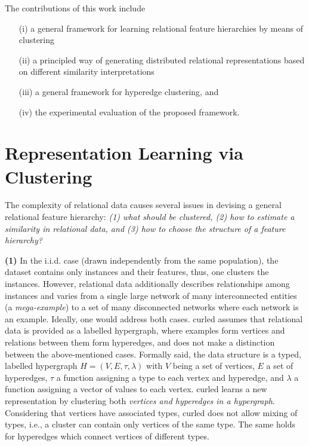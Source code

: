 The contributions of this work include
\begin{itemize}
	\item[(i)] a general framework for learning relational feature hierarchies by means of clustering
	\item[(ii)] a principled way of generating distributed relational representations based on different similarity interpretations
	\item[(iii)] a general framework for hyperedge clustering, and 
	\item[(iv)] the experimental evaluation of the proposed framework.
\end{itemize}



\section{Representation Learning via Clustering}
\label{sec:RL}

The complexity of relational data causes several issues in devising a general relational feature hierarchy: \textit{(1) what should be clustered, (2) how to estimate a similarity in relational data, and (3) how to choose the structure of a feature hierarchy? }


\textbf{(1)} 
In the i.i.d. case (drawn independently from the same population), the dataset contains only instances and their features, thus, one clusters the instances.
However, relational data additionally describes relationships among instances and  varies from a single large network of many interconnected entities (a \textit{mega-example}) to a set of many disconnected networks where each network is an example.
Ideally, one would address both cases.
\gls{curled} assumes that relational data is provided as a labelled hypergraph, where examples form vertices and relations between them form hyperedges, and does not make a distinction between the above-mentioned cases.
Formally said, the data structure is a typed, labelled hypergraph $H = (V,E, \tau, \lambda)$ with $V$ being a set of vertices, $E$ a set of hyperedges, $\tau$  a function  assigning a type to each vertex and hyperedge, and $\lambda$ a function assigning a vector of values to each vertex. 
\gls{curled} learns a new representation by clustering both \textit{vertices and hyperedges in a hypergraph}.
Considering that vertices have associated types, \gls{curled} does not allow mixing of types, i.e., a cluster can contain only vertices of the same type.
The same holds for hyperedges which connect vertices of different types. 


